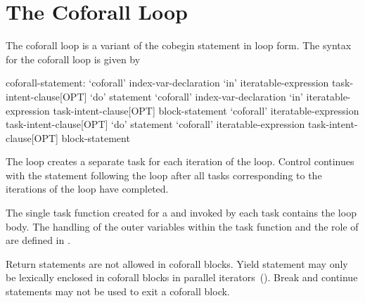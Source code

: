 \section{The Coforall Loop}
\label{Coforall}

The coforall loop is a variant of the cobegin statement in loop form.
The syntax for the coforall loop is given by
\begin{syntax}
coforall-statement:
  `coforall' index-var-declaration `in' iteratable-expression task-intent-clause[OPT] `do' statement
  `coforall' index-var-declaration `in' iteratable-expression task-intent-clause[OPT] block-statement
  `coforall' iteratable-expression task-intent-clause[OPT] `do' statement
  `coforall' iteratable-expression task-intent-clause[OPT] block-statement
\end{syntax}

The  loop creates a separate task for each iteration of
the loop.  Control continues with the statement following
the  loop after all tasks corresponding to the
iterations of the loop have completed.

The single task function created for a  and invoked by
each task contains the loop body.
The handling of the outer variables within the task function and
the role of  are defined in .

Return statements are not allowed in coforall blocks.  Yield statement
may only be lexically enclosed in coforall blocks in parallel
iterators~().  Break and continue statements
may not be used to exit a coforall block.

